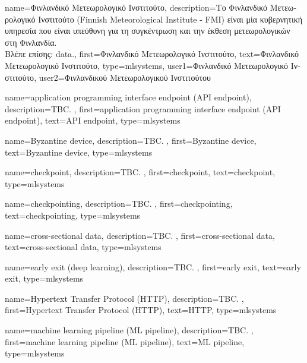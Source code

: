 {name={\foreignlanguage{greek}{Φινλανδικό Μετεωρολογικό Ινστιτούτο}}, 
	description={\foreignlanguage{greek}{Το Φινλανδικό Μετεωρολογικό Ινστιτούτο}
		(Finnish Meteorological Institute - FMI) 
		\foreignlanguage{greek}{είναι μία κυβερνητική υπηρεσία που είναι υπεύθυνη 
		για τη συγκέντρωση και την έκθεση μετεωρολογικών}  \foreignlanguage{greek}{στη Φινλανδία.} 
		\\
		\foreignlanguage{greek}{Βλέπε επίσης:} \gls{data}.},
	first={\foreignlanguage{greek}{Φινλανδικό Μετεωρολογικό Ινστιτούτο}},
	text={\foreignlanguage{greek}{Φινλανδικό Μετεωρολογικό Ινστιτούτο}},
	type=mlsystems,
	user1={\foreignlanguage{greek}{Φινλανδικό Μετεωρολογικό Ινστιτούτο}}, %
	user2={\foreignlanguage{greek}{Φινλανδικού Μετεωρολογικού Ινστιτούτου}} %
}

{name={application programming interface endpoint (API endpoint)},
	description={TBC. },
	first={application programming interface endpoint (API endpoint)},
	text={API endpoint},
	type=mlsystems
}

{name={Byzantine device},
	description={TBC. },
	first={Byzantine device},
	text={Byzantine device},
	type=mlsystems
}

{name={checkpoint},
	description={TBC. },
	first={checkpoint},
	text={checkpoint},
	type=mlsystems
}

{name={checkpointing},
	description={TBC. },
	first={checkpointing},
	text={checkpointing},
	type=mlsystems
}

{name={cross-sectional data},
	description={TBC. },
	first={cross-sectional data},
	text={cross-sectional data},
	type=mlsystems
}

{name={early exit (deep learning)},
	description={TBC. }, 
	first={early exit},
	text={early exit},
	type=mlsystems
}

{name={Hypertext Transfer Protocol (HTTP)},
	description={TBC. },
	first={Hypertext Transfer Protocol (HTTP)},
	text={HTTP},
	type=mlsystems
}

{name={machine learning pipeline (ML pipeline)},
	description={TBC. },
	first={machine learning pipeline (ML pipeline)},
	text={ML pipeline},
	type=mlsystems
}

